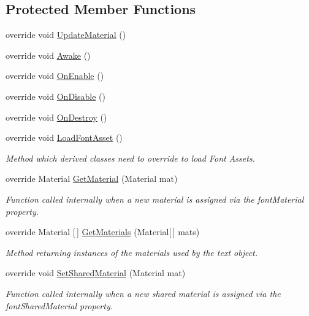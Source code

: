 \subsection*{Protected Member Functions}
\begin{DoxyCompactItemize}
\item 
override void \mbox{\hyperlink{class_t_m_pro_1_1_text_mesh_pro_ae087fd09b3ce4bb5bfea21e7207f3d56}{Update\+Material}} ()
\item 
override void \mbox{\hyperlink{class_t_m_pro_1_1_text_mesh_pro_a941d6ec780b9e2735b52ab08392f7905}{Awake}} ()
\item 
override void \mbox{\hyperlink{class_t_m_pro_1_1_text_mesh_pro_a4d5bc19335502eec964edd5fd7c71f2f}{On\+Enable}} ()
\item 
override void \mbox{\hyperlink{class_t_m_pro_1_1_text_mesh_pro_a75d6c0f1ce9e73004a4a3b2766e236c7}{On\+Disable}} ()
\item 
override void \mbox{\hyperlink{class_t_m_pro_1_1_text_mesh_pro_a158269bbde6633eb1a5621203f518e87}{On\+Destroy}} ()
\item 
override void \mbox{\hyperlink{class_t_m_pro_1_1_text_mesh_pro_a5bb3ac2d25483c61b10064917225ca59}{Load\+Font\+Asset}} ()
\begin{DoxyCompactList}\small\item\em Method which derived classes need to override to load Font Assets. \end{DoxyCompactList}\item 
override Material \mbox{\hyperlink{class_t_m_pro_1_1_text_mesh_pro_ae6a678bcadc435d05afa59758e5b70f4}{Get\+Material}} (Material mat)
\begin{DoxyCompactList}\small\item\em Function called internally when a new material is assigned via the font\+Material property. \end{DoxyCompactList}\item 
override Material \mbox{[}$\,$\mbox{]} \mbox{\hyperlink{class_t_m_pro_1_1_text_mesh_pro_acbc561637c8727b420c808139960a68c}{Get\+Materials}} (Material\mbox{[}$\,$\mbox{]} mats)
\begin{DoxyCompactList}\small\item\em Method returning instances of the materials used by the text object. \end{DoxyCompactList}\item 
override void \mbox{\hyperlink{class_t_m_pro_1_1_text_mesh_pro_a50256541f1e533a8fd3fd4b7830936d8}{Set\+Shared\+Material}} (Material mat)
\begin{DoxyCompactList}\small\item\em Function called internally when a new shared material is assigned via the font\+Shared\+Material property. \end{DoxyCompactList}\item 

\end{DoxyCompactItemize}
